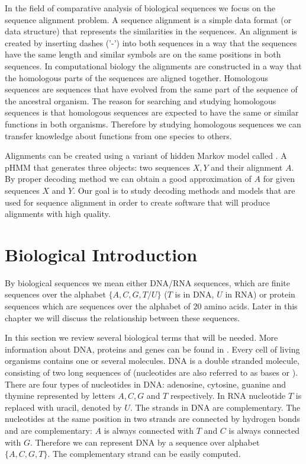 In the field of comparative analysis of biological sequences we focus on the
sequence alignment problem. A sequence alignment is a simple data format (or
data structure) that represents the similarities in the sequences. An alignment
is created by inserting dashes ('-') into both sequences in a way that the
sequences have the same length and similar symbols are on the same positions in
both sequences. In computational biology the alignments are constructed in a way
that the homologous parts of the sequences are aligned together. Homologous
sequences are sequences that have evolved from the same part of the sequence of
the ancestral organism.  The reason for searching and studying homologous
sequences is that homologous sequences are expected to have the same or similar
functions in both organisms.  Therefore by studying homologous sequences we can
transfer knowledge about functions from one species to others.

Alignments can be created using a variant of hidden Markov model called
. A pHMM  that generates three
objects: two sequences $X,Y$ and their alignment $A$.  By proper decoding method
we can obtain a good approximation of $A$ for given sequences $X$ and $Y$. Our
goal is to study decoding methods and models that are used for sequence
alignment in order to create software that will produce alignments with high
quality.


\section{Biological Introduction}




By biological sequences we mean either DNA/RNA sequences, which are finite
sequences over the alphabet $\{A,C,G,T/U\}$ ($T$ is in DNA, $U$ in RNA) or
protein sequences which are sequences over the alphabet of $20$ amino acids.
Later in this chapter we will discuss the relationship between these sequences.


In this section we review several biological terms that will be needed. More
information about DNA, proteins and genes can be found in
\cite{BiologyForDummies,UnderstandingBioinformatics}.  Every cell of living
organisms contains one or several  molecules. DNA is a double
stranded molecule, consisting of two long sequences of 
(nucleotides are also referred to as bases or ). There are
four types of nucleotides in DNA: adenosine, cytosine, guanine and thymine
represented by letters $A,C,G$ and $T$ respectively. In RNA nucleotide $T$ is
replaced with uracil, denoted by $U$. The strands in DNA are complementary. The
nucleotides at the same position in two strands are connected by hydrogen bonds
and are complementary: $A$ is always connected with $T$ and $C$ is always
connected with $G$. Therefore we can represent DNA by a sequence over alphabet
$\{A,C,G,T\}$. The complementary strand can be easily computed.

